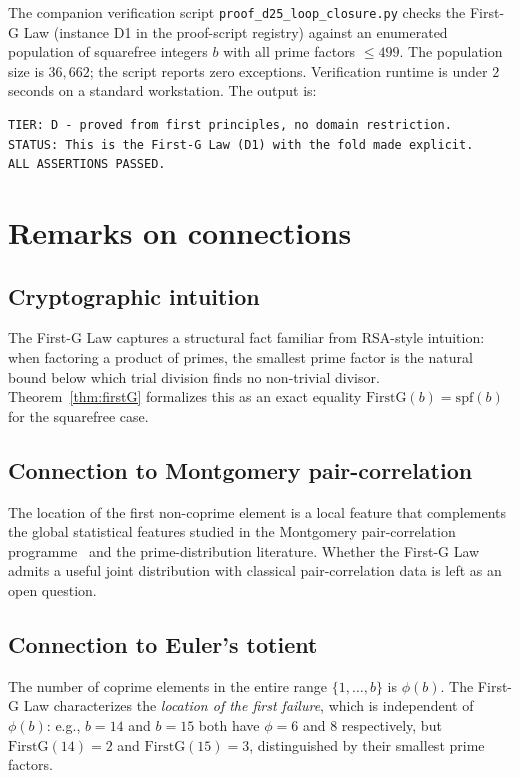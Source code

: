\documentclass[11pt,reqno]{amsart}
\theoremstyle{plain}
\theoremstyle{definition}
\begin{document}
The companion verification script \texttt{proof\_d25\_loop\_closure.py}
checks the First-G Law (instance D1 in the proof-script registry)
against an enumerated population of squarefree integers $b$ with
all prime factors $\leq 499$. The population size is $36{,}662$;
the script reports zero exceptions. Verification runtime is under
$2$ seconds on a standard workstation. The output is:

\begin{verbatim}
TIER: D - proved from first principles, no domain restriction.
STATUS: This is the First-G Law (D1) with the fold made explicit.
ALL ASSERTIONS PASSED.
\end{verbatim}

\section{Remarks on connections}

\subsection{Cryptographic intuition}
The First-G Law captures a structural fact familiar from RSA-style
intuition: when factoring a product of primes, the smallest prime
factor is the natural bound below which trial division finds no
non-trivial divisor. Theorem~\ref{thm:firstG} formalizes this as
an exact equality $\mathrm{FirstG}(b) = \mathrm{spf}(b)$ for the
squarefree case.

\subsection{Connection to Montgomery pair-correlation}
The location of the first non-coprime element is a local feature
that complements the global statistical features studied in the
Montgomery pair-correlation programme~\cite{montgomery1973} and the
prime-distribution literature. Whether the First-G Law admits a
useful joint distribution with classical pair-correlation data is
left as an open question.

\subsection{Connection to Euler's totient}
The number of coprime elements in the entire range
$\{1, \ldots, b\}$ is $\phi(b)$. The First-G Law characterizes the
\emph{location of the first failure}, which is independent of
$\phi(b)$: e.g., $b = 14$ and $b = 15$ both have $\phi = 6$ and
$8$ respectively, but $\mathrm{FirstG}(14) = 2$ and
$\mathrm{FirstG}(15) = 3$, distinguished by their smallest prime
factors.
\end{document}

